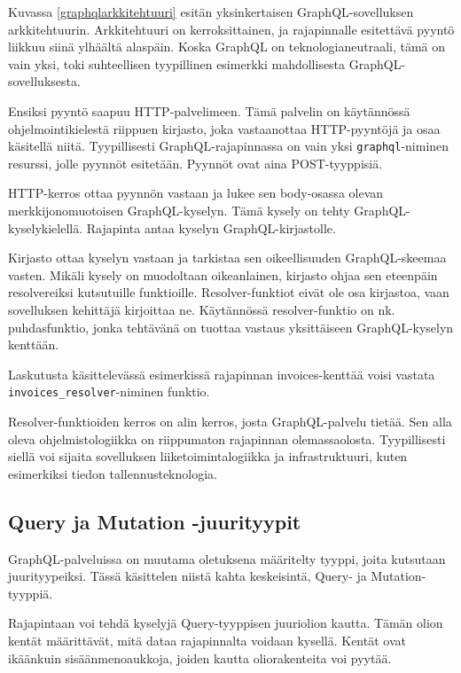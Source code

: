 Kuvassa \ref{graphqlarkkitehtuuri} esitän yksinkertaisen
GraphQL-sovelluksen arkkitehtuurin. Arkkitehtuuri on kerroksittainen, ja
rajapinnalle esitettävä pyyntö liikkuu siinä ylhäältä alaspäin. Koska
GraphQL on teknologianeutraali, tämä on vain yksi, toki suhteellisen
tyypillinen esimerkki mahdollisesta GraphQL-sovelluksesta.

Ensiksi pyyntö saapuu HTTP-palvelimeen. Tämä palvelin on käytännössä
ohjelmointikielestä riippuen kirjasto, joka vastaanottaa HTTP-pyyntöjä
ja osaa käsitellä niitä. Tyypillisesti GraphQL-rajapinnassa on vain yksi
\texttt{graphql}-niminen resurssi, jolle pyynnöt esitetään. Pyynnöt ovat
aina POST-tyyppisiä.

HTTP-kerros ottaa pyynnön vastaan ja lukee sen body-osassa olevan
merkkijonomuotoisen GraphQL-kyselyn. Tämä kysely on tehty
GraphQL-kyselykielellä. Rajapinta antaa kyselyn GraphQL-kirjastolle.

Kirjasto ottaa kyselyn vastaan ja tarkistaa sen oikeellisuuden
GraphQL-skeemaa vasten. Mikäli kysely on muodoltaan oikeanlainen,
kirjasto ohjaa sen eteenpäin resolvereiksi kutsutuille funktioille.
Resolver-funktiot eivät ole osa kirjastoa, vaan sovelluksen kehittäjä
kirjoittaa ne. Käytännössä resolver-funktio on nk. \gls{puhdasfunktio},
jonka tehtävänä on tuottaa vastaus yksittäiseen GraphQL-kyselyn
kenttään.

Laskutusta käsittelevässä esimerkissä rajapinnan invoices-kenttää voisi
vastata \texttt{invoices\_resolver}-niminen funktio.

Resolver-funktioiden kerros on alin kerros, josta GraphQL-palvelu
tietää. Sen alla oleva ohjelmistologiikka on riippumaton rajapinnan
olemassaolosta. Tyypillisesti siellä voi sijaita sovelluksen
liiketoimintalogiikka ja infrastruktuuri, kuten esimerkiksi tiedon
tallennusteknologia.

\hypertarget{query-ja-mutation--juurityypit}{%
\subsection{Query ja Mutation
-juurityypit}\label{query-ja-mutation--juurityypit}}

GraphQL-palveluissa on muutama oletuksena määritelty tyyppi, joita
kutsutaan juurityypeiksi. Tässä käsittelen niistä kahta keskeisintä,
Query- ja Mutation-tyyppiä.

Rajapintaan voi tehdä kyselyjä Query-tyyppisen juuriolion kautta. Tämän
olion kentät määrittävät, mitä dataa rajapinnalta voidaan kysellä.
Kentät ovat ikäänkuin sisäänmenoaukkoja, joiden kautta oliorakenteita
voi pyytää.

